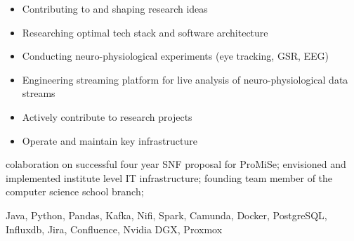 \documentclass[9pt,a4paper]{altacv}
\begin{document}
%
\makebox[0pt][l]{%
  \hspace{-4cm}
  \raisebox{-\totalheight}[0pt][0pt]{%
   {\color{background}\fontsize{250}{48}\faRocket}
}}%

%


\begin{itemize}
\item Contributing to and shaping research ideas
\item Researching optimal tech stack and software architecture
\item Conducting neuro-physiological experiments (eye tracking, GSR, EEG)
\item Engineering streaming platform for live analysis of neuro-physiological data streams
\item Actively contribute to research projects
\item Operate and maintain key infrastructure
\end{itemize}

colaboration on successful four year SNF proposal for ProMiSe;
envisioned and implemented institute level IT infrastructure;
founding team member of the computer science school branch;


Java, Python, Pandas, Kafka, Nifi, Spark, Camunda, Docker, PostgreSQL, Influxdb, Jira, Confluence, Nvidia DGX, Proxmox


\divider

%

\end{document}
